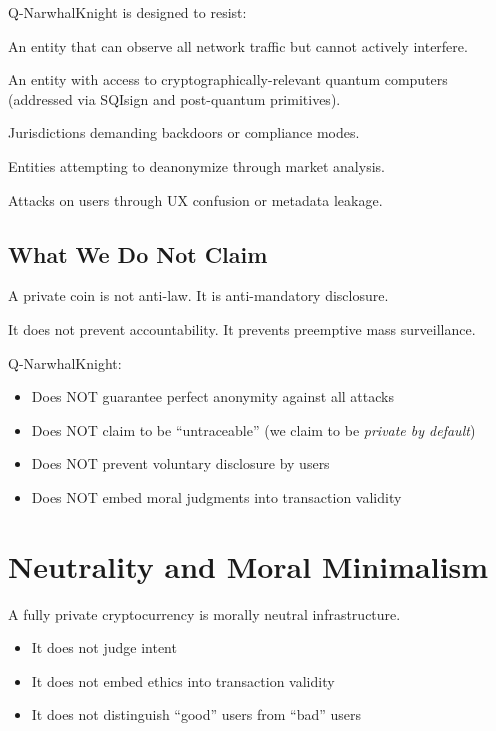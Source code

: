 \documentclass[12pt,a4paper]{article}
\begin{document}
Q-NarwhalKnight is designed to resist:

\begin{description}[leftmargin=1cm]
    \item[Global Passive Adversary:] An entity that can observe all network traffic but cannot actively interfere.
    \item[Quantum Adversary:] An entity with access to cryptographically-relevant quantum computers (addressed via SQIsign and post-quantum primitives).
    \item[Regulatory Adversary:] Jurisdictions demanding backdoors or compliance modes.
    \item[Economic Adversary:] Entities attempting to deanonymize through market analysis.
    \item[Social Engineering:] Attacks on users through UX confusion or metadata leakage.
\end{description}

\subsection{What We Do Not Claim}

A private coin is not anti-law. It is anti-mandatory disclosure.

It does not prevent accountability. It prevents preemptive mass surveillance.

Q-NarwhalKnight:
\begin{itemize}
    \item Does NOT guarantee perfect anonymity against all attacks
    \item Does NOT claim to be ``untraceable'' (we claim to be \textit{private by default})
    \item Does NOT prevent voluntary disclosure by users
    \item Does NOT embed moral judgments into transaction validity
\end{itemize}

\section{Neutrality and Moral Minimalism}

A fully private cryptocurrency is morally neutral infrastructure.

\begin{itemize}
    \item It does not judge intent
    \item It does not embed ethics into transaction validity
    \item It does not distinguish ``good'' users from ``bad'' users
\end{itemize}
\end{document}
